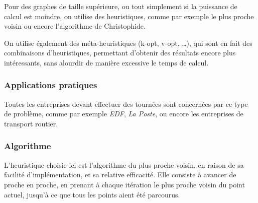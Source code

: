                 Pour des graphes de taille supérieure, ou tout simplement
                si la puissance de calcul est moindre, on utilise des heuristiques,
                comme par exemple le plus proche voisin ou encore l'algorithme de Christophide.

                On utilise également des méta-heuristiques (k-opt, v-opt, \ldots),
                qui sont en fait des combinaisons
                d'heuristiques, permettant d'obtenir des résultats encore plus intéressants,
                sans alourdir de manière excessive le temps de calcul.

        \subsubsection{Applications pratiques}
            Toutes les entreprises devant effectuer des tournées sont concernées
            par ce type de problème, comme par exemple \emph{EDF},
            \emph{La Poste}, ou encore les entreprises de transport routier.
        \subsubsection{Algorithme}
            L'heuristique choisie ici est l'algorithme du plus proche voisin,
            en raison de sa facilité d'implémentation, et sa relative efficacité.
            Elle consiste à avancer de proche en proche, en prenant à chaque itération le plus
            proche voisin du point actuel, jusqu'à ce que tous les points aient
            été parcourus.
